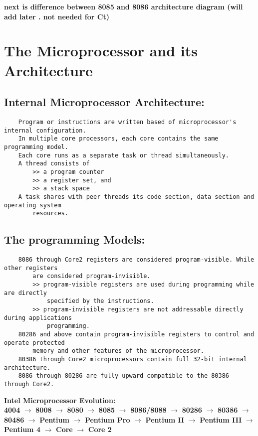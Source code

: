 \documentclass{article}
\begin{document}
\textbf{next is difference between 8085 and 8086 architecture diagram (will add later . not needed for Ct)}
\newpage
\section*{The Microprocessor and its Architecture}
\subsection*{Internal Microprocessor Architecture:}

\begin{verbatim}
    Program or instructions are written based of microprocessor's internal configuration.
    In multiple core processors, each core contains the same programming model.
    Each core runs as a separate task or thread simultaneously.
    A thread consists of 
        >> a program counter
        >> a register set, and
        >> a stack space
    A task shares with peer threads its code section, data section and operating system
        resources.
\end{verbatim}

\subsection*{The programming Models:}

\begin{verbatim}
    8086 through Core2 registers are considered program-visible. While other registers
        are considered program-invisible.
        >> program-visible registers are used during programming while are directly
            specified by the instructions.
        >> program-invisible registers are not addressable directly during applications
            programming. 
    80286 and above contain program-invisible registers to control and operate protected
        memory and other features of the microprocessor.
    80386 through Core2 microprocessors contain full 32-bit internal architecture.
    8086 through 80286 are fully upward compatible to the 80386 through Core2.
\end{verbatim}
\vspace*{20pt}

\textbf{Intel Microprocessor Evolution:}\\

\textbf{4004} $\rightarrow$ \textbf{8008} $\rightarrow$ \textbf{8080} $\rightarrow$ \textbf{8085} $\rightarrow$ \textbf{8086/8088} $\rightarrow$ \textbf{80286} $\rightarrow$ \textbf{80386} $\rightarrow$ \textbf{80486} $\rightarrow$ \textbf{Pentium} $\rightarrow$ \textbf{Pentium Pro} $\rightarrow$ \textbf{Pentium II} $\rightarrow$ \textbf{Pentium III} $\rightarrow$ \textbf{Pentium 4} $\rightarrow$ \textbf{Core} $\rightarrow$ \textbf{Core 2}
\end{document}
